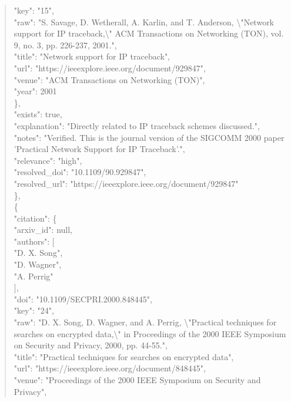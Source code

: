 \documentclass[11pt]{article}
\begin{document}
\begin{quote}
        "key": "15",\\
        "raw": "S. Savage, D. Wetherall, A. Karlin, and T. Anderson, \textbackslash{}"Network support for IP traceback,\textbackslash{}" ACM Transactions on Networking (TON), vol. 9, no. 3, pp. 226-237, 2001.",\\
        "title": "Network support for IP traceback",\\
        "url": "https://ieeexplore.ieee.org/document/929847",\\
        "venue": "ACM Transactions on Networking (TON)",\\
        "year": 2001\\
      \},\\
      "exists": true,\\
      "explanation": "Directly related to IP traceback schemes discussed.",\\
      "notes": "Verified. This is the journal version of the SIGCOMM 2000 paper 'Practical Network Support for IP Traceback'.",\\
      "relevance": "high",\\
      "resolved\_doi": "10.1109/90.929847",\\
      "resolved\_url": "https://ieeexplore.ieee.org/document/929847"\\
    \},\\
    \{\\
      "citation": \{\\
        "arxiv\_id": null,\\
        "authors": [\\
          "D. X. Song",\\
          "D. Wagner",\\
          "A. Perrig"\\
        ],\\
        "doi": "10.1109/SECPRI.2000.848445",\\
        "key": "24",\\
        "raw": "D. X. Song, D. Wagner, and A. Perrig, \textbackslash{}"Practical techniques for searches on encrypted data,\textbackslash{}" in Proceedings of the 2000 IEEE Symposium on Security and Privacy, 2000, pp. 44-55.",\\
        "title": "Practical techniques for searches on encrypted data",\\
        "url": "https://ieeexplore.ieee.org/document/848445",\\
        "venue": "Proceedings of the 2000 IEEE Symposium on Security and Privacy",\\

\end{quote}
\end{document}
